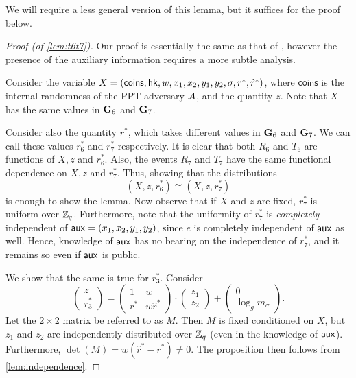We will require a less general version of this lemma, but it suffices for the proof below.

\begin{proof}[Proof (of \cref{lem:t6t7})]
	Our proof is essentially the same as that of \cite{cs01}, however the presence of the auxiliary information requires a more subtle analysis.
	
	Consider the variable $X=(\mathsf{coins},\mathsf{hk},w,x_1,x_2,y_1,y_2,\sigma,r^{*},\hat{r}^{*})$, where $\mathsf{coins}$ is the internal randomness of the PPT adversary $\mathcal{A}$, and the quantity $z$. Note that $X$ has the same values in $\mathbf{G}_6$ and $\mathbf{G}_7$.
	
	Consider also the quantity $r^{*}$, which takes different values in $\mathbf{G}_6$ and $\mathbf{G}_7$. We can call these values $r_6^{*}$ and $r^{*}_7$ respectively. It is clear that both $R_6$ and $T_6$ are functions of $X,z$ and $r^{*}_6$. Also, the events $R_7$ and $T_7$ have the same functional dependence on $X,z$ and $r^{*}_7$. Thus, showing that the distributions
	$$(X, z, r^{*}_6)\cong(X, z, r^{*}_7)$$ is enough to show the lemma. Now observe that if $X$ and $z$ are fixed, $r^{*}_7$ is uniform over $\mathbb{Z}_q$. Furthermore, note that the uniformity of $r^{*}_7$ is \textit{completely} independent of $\mathsf{aux} = (x_1,x_2,y_1,y_2)$, since $e$ is completely independent of $\mathsf{aux}$ as well. Hence, knowledge of $\mathsf{aux}$ has no bearing on the independence of $r^{*}_7$, and it remains so even if $\mathsf{aux}$ is public.
	
	We show that the same is true for $r^{*}_3$. Consider
	\begin{equation*}
		\begin{pmatrix}
			z\\
			r^{*}_3
		\end{pmatrix}=
		\begin{pmatrix}
			1 & w\\
			r^{*} & w\hat{r}^{*}
		\end{pmatrix}\cdot
		\begin{pmatrix}
			z_1\\
			z_2
		\end{pmatrix}+
		\begin{pmatrix}
			0\\
			\log_gm_{\sigma}
		\end{pmatrix}.
	\end{equation*}
	Let the $2\times 2$ matrix be referred to as $M$. Then $M$ is fixed conditioned on $X$, but $z_1$ and $z_2$ are independently distributed over $\mathbb{Z}_q$ (even in the knowledge of $\mathsf{aux}$). Furthermore, $\det(M) = w(\hat{r}^{*} - r^{*})\neq 0$. The proposition then follows from \cref{lem:independence}.
\end{proof}

